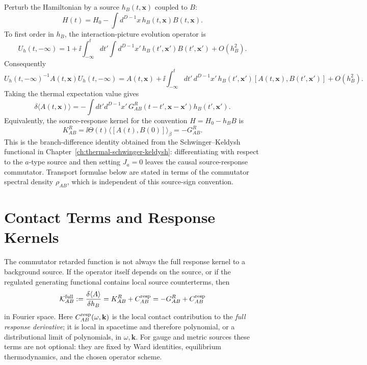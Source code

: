 Perturb the Hamiltonian by a source \(h_B(t,\mathbf x)\) coupled to \(B\):
\begin{equation}
  H(t)=H_0-\int d^{D-1}x\,h_B(t,\mathbf x)B(t,\mathbf x).
  \label{eq:kubo-source-hamiltonian}
\end{equation}
To first order in \(h_B\), the interaction-picture evolution operator is
\[
  U_h(t,-\infty)
  =
  1+\ii\int_{-\infty}^{t}dt'\int d^{D-1}x'\,
  h_B(t',\mathbf x')B(t',\mathbf x')+O(h_B^2).
\]
Consequently
\[
  U_h(t,-\infty)^{-1}A(t,\mathbf x)U_h(t,-\infty)
  =
  A(t,\mathbf x)
  +
  \ii\int_{-\infty}^{t}dt'\,d^{D-1}x'\,
  h_B(t',\mathbf x')
  [A(t,\mathbf x),B(t',\mathbf x')]
  +O(h_B^2).
\]
Taking the thermal expectation value gives
\begin{equation}
  \delta\langle A(t,\mathbf x)\rangle
  =
  -\int dt' d^{D-1}x'\,
  G^R_{AB}(t-t',\mathbf x-\mathbf x')h_B(t',\mathbf x').
  \label{eq:kubo-linear-response}
\end{equation}
Equivalently, the source-response kernel for the convention
\(H=H_0-h_BB\) is
\[
  K^R_{AB}
  =
  \ii\Theta(t)\langle[A(t),B(0)]\rangle_\beta
  =
  -G^R_{AB}.
\]
This is the branch-difference identity obtained from the
Schwinger--Keldysh functional in
Chapter~\ref{ch:thermal-schwinger-keldysh}: differentiating with respect to
the \(a\)-type source and then setting \(J_a=0\) leaves the causal
source-response commutator.  Transport formulae below are stated in terms of
the commutator spectral density \(\rho_{AB}\), which is independent of this
source-sign convention.

\section{Contact Terms and Response Kernels}

The commutator retarded function is not always the full response kernel to a
background source.  If the operator itself depends on the source, or if the
regulated generating functional contains local source counterterms, then
\begin{equation}
  \mathcal K^{\rm full}_{AB}
  :=
  \frac{\delta\langle A\rangle}{\delta h_B}
  =
  K^R_{AB}+C^{\rm resp}_{AB}
  =
  -G^R_{AB}+C^{\rm resp}_{AB}
  \label{eq:kubo-full-source-response-contact}
\end{equation}
in Fourier space.  Here \(C^{\rm resp}_{AB}(\omega,\mathbf k)\) is the local
contact contribution to the \emph{full response derivative}; it is local in
spacetime and therefore polynomial, or a distributional limit of
polynomials, in \(\omega,\mathbf k\).  For gauge and metric sources these
terms are not optional: they are fixed by Ward identities, equilibrium
thermodynamics, and the chosen operator scheme.


